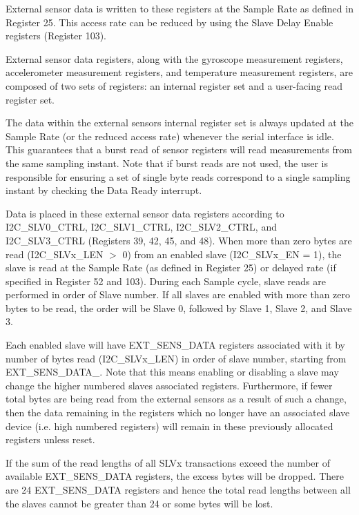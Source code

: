 External sensor data is written to these registers at the Sample Rate as defined in Register 25. This access rate can be reduced by using the Slave Delay Enable registers (Register 103).

External sensor data registers, along with the gyroscope measurement registers, accelerometer measurement registers, and temperature measurement registers, are composed of two sets of registers\+: an internal register set and a user-\/facing read register set.

The data within the external sensors\textquotesingle{} internal register set is always updated at the Sample Rate (or the reduced access rate) whenever the serial interface is idle. This guarantees that a burst read of sensor registers will read measurements from the same sampling instant. Note that if burst reads are not used, the user is responsible for ensuring a set of single byte reads correspond to a single sampling instant by checking the Data Ready interrupt.

Data is placed in these external sensor data registers according to I2\+C\+\_\+\+S\+L\+V0\+\_\+\+C\+T\+RL, I2\+C\+\_\+\+S\+L\+V1\+\_\+\+C\+T\+RL, I2\+C\+\_\+\+S\+L\+V2\+\_\+\+C\+T\+RL, and I2\+C\+\_\+\+S\+L\+V3\+\_\+\+C\+T\+RL (Registers 39, 42, 45, and 48). When more than zero bytes are read (I2\+C\+\_\+\+S\+L\+Vx\+\_\+\+L\+EN $>$ 0) from an enabled slave (I2\+C\+\_\+\+S\+L\+Vx\+\_\+\+EN = 1), the slave is read at the Sample Rate (as defined in Register 25) or delayed rate (if specified in Register 52 and 103). During each Sample cycle, slave reads are performed in order of Slave number. If all slaves are enabled with more than zero bytes to be read, the order will be Slave 0, followed by Slave 1, Slave 2, and Slave 3.

Each enabled slave will have E\+X\+T\+\_\+\+S\+E\+N\+S\+\_\+\+D\+A\+TA registers associated with it by number of bytes read (I2\+C\+\_\+\+S\+L\+Vx\+\_\+\+L\+EN) in order of slave number, starting from E\+X\+T\+\_\+\+S\+E\+N\+S\+\_\+\+D\+A\+T\+A\+\_. Note that this means enabling or disabling a slave may change the higher numbered slaves\textquotesingle{} associated registers. Furthermore, if fewer total bytes are being read from the external sensors as a result of such a change, then the data remaining in the registers which no longer have an associated slave device (i.\+e. high numbered registers) will remain in these previously allocated registers unless reset.

If the sum of the read lengths of all S\+L\+Vx transactions exceed the number of available E\+X\+T\+\_\+\+S\+E\+N\+S\+\_\+\+D\+A\+TA registers, the excess bytes will be dropped. There are 24 E\+X\+T\+\_\+\+S\+E\+N\+S\+\_\+\+D\+A\+TA registers and hence the total read lengths between all the slaves cannot be greater than 24 or some bytes will be lost.

